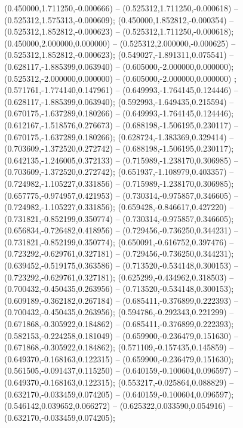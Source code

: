  (0.450000,1.711250,-0.000666) -- (0.525312,1.711250,-0.000618) -- (0.525312,1.575313,-0.000609);
 (0.450000,1.852812,-0.000354) -- (0.525312,1.852812,-0.000623) -- (0.525312,1.711250,-0.000618);
 (0.450000,2.000000,0.000000) -- (0.525312,2.000000,-0.000625) -- (0.525312,1.852812,-0.000623);
 (0.549027,-1.891311,0.075541) -- (0.628117,-1.885399,0.063940) -- (0.605000,-2.000000,0.000000);
 (0.525312,-2.000000,0.000000) -- (0.605000,-2.000000,0.000000) ;
 (0.571761,-1.774140,0.147961) -- (0.649993,-1.764145,0.124446) -- (0.628117,-1.885399,0.063940);
 (0.592993,-1.649435,0.215594) -- (0.670175,-1.637289,0.180266) -- (0.649993,-1.764145,0.124446);
 (0.612167,-1.518576,0.276673) -- (0.688198,-1.506195,0.230117) -- (0.670175,-1.637289,0.180266);
 (0.628724,-1.383369,0.329414) -- (0.703609,-1.372520,0.272742) -- (0.688198,-1.506195,0.230117);
 (0.642135,-1.246005,0.372133) -- (0.715989,-1.238170,0.306985) -- (0.703609,-1.372520,0.272742);
 (0.651937,-1.108979,0.403357) -- (0.724982,-1.105227,0.331856) -- (0.715989,-1.238170,0.306985);
 (0.657775,-0.974957,0.421953) -- (0.730314,-0.975857,0.346605) -- (0.724982,-1.105227,0.331856);
 (0.659428,-0.846617,0.427220) -- (0.731821,-0.852199,0.350774) -- (0.730314,-0.975857,0.346605);
 (0.656834,-0.726482,0.418956) -- (0.729456,-0.736250,0.344231) -- (0.731821,-0.852199,0.350774);
 (0.650091,-0.616752,0.397476) -- (0.723292,-0.629761,0.327181) -- (0.729456,-0.736250,0.344231);
 (0.639452,-0.519175,0.363586) -- (0.713520,-0.534148,0.300153) -- (0.723292,-0.629761,0.327181);
 (0.625299,-0.434962,0.318503) -- (0.700432,-0.450435,0.263956) -- (0.713520,-0.534148,0.300153);
 (0.609189,-0.362182,0.267184) -- (0.685411,-0.376899,0.222393) -- (0.700432,-0.450435,0.263956);
 (0.594786,-0.292343,0.221299) -- (0.671868,-0.305922,0.184862) -- (0.685411,-0.376899,0.222393);
 (0.582153,-0.224258,0.181049) -- (0.659900,-0.236479,0.151630) -- (0.671868,-0.305922,0.184862);
 (0.571109,-0.157435,0.145859) -- (0.649370,-0.168163,0.122315) -- (0.659900,-0.236479,0.151630);
 (0.561505,-0.091437,0.115250) -- (0.640159,-0.100604,0.096597) -- (0.649370,-0.168163,0.122315);
 (0.553217,-0.025864,0.088829) -- (0.632170,-0.033459,0.074205) -- (0.640159,-0.100604,0.096597);
 (0.546142,0.039652,0.066272) -- (0.625322,0.033590,0.054916) -- (0.632170,-0.033459,0.074205);
